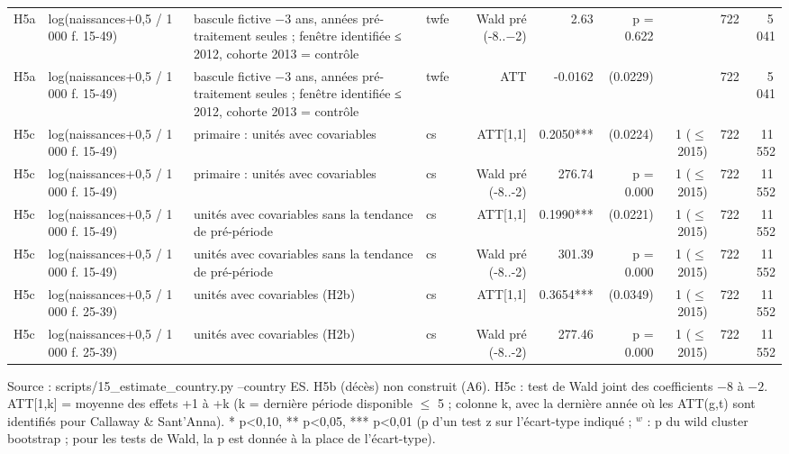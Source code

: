 \begin{table}
\begin{threeparttable}
\begin{tabular}{lp{4.3cm}p{7.1cm}lrrrrrr}
H5a & log(naissances+0,5 / 1 000 f. 15-49) & bascule fictive $-$3 ans, années pré-traitement seules ; fenêtre identifiée ≤ 2012, cohorte 2013 = contrôle & twfe & Wald pré (-8..$-$2) & 2.63 & p = 0.622 &  & 722 & 5\,041 \\
H5a & log(naissances+0,5 / 1 000 f. 15-49) & bascule fictive $-$3 ans, années pré-traitement seules ; fenêtre identifiée ≤ 2012, cohorte 2013 = contrôle & twfe & ATT & -0.0162 & (0.0229) &  & 722 & 5\,041 \\
H5c & log(naissances+0,5 / 1 000 f. 15-49) & primaire : unités avec covariables & cs & ATT[1,1] & 0.2050*** & (0.0224) & 1 ($\leq$ 2015) & 722 & 11\,552 \\
H5c & log(naissances+0,5 / 1 000 f. 15-49) & primaire : unités avec covariables & cs & Wald pré (-8..-2) & 276.74 & p = 0.000 & 1 ($\leq$ 2015) & 722 & 11\,552 \\
H5c & log(naissances+0,5 / 1 000 f. 15-49) & unités avec covariables sans la tendance de pré-période & cs & ATT[1,1] & 0.1990*** & (0.0221) & 1 ($\leq$ 2015) & 722 & 11\,552 \\
H5c & log(naissances+0,5 / 1 000 f. 15-49) & unités avec covariables sans la tendance de pré-période & cs & Wald pré (-8..-2) & 301.39 & p = 0.000 & 1 ($\leq$ 2015) & 722 & 11\,552 \\
H5c & log(naissances+0,5 / 1 000 f. 25-39) & unités avec covariables (H2b) & cs & ATT[1,1] & 0.3654*** & (0.0349) & 1 ($\leq$ 2015) & 722 & 11\,552 \\
H5c & log(naissances+0,5 / 1 000 f. 25-39) & unités avec covariables (H2b) & cs & Wald pré (-8..-2) & 277.46 & p = 0.000 & 1 ($\leq$ 2015) & 722 & 11\,552 \\
\bottomrule
\end{tabular}
\begin{tablenotes}\footnotesize
\item Source : scripts/15\_estimate\_country.py --country ES. H5b (décès) non construit (A6). H5c : test de Wald joint des coefficients $-8$ à $-2$. ATT[1,k] = moyenne des effets +1 à +k (k = dernière période disponible $\leq$ 5 ; colonne k, avec la dernière année où les ATT(g,t) sont identifiés pour Callaway \& Sant'Anna). * p<0,10, ** p<0,05, *** p<0,01 (p d'un test z sur l'écart-type indiqué ; $^{w}$ : p du wild cluster bootstrap ; pour les tests de Wald, la p est donnée à la place de l'écart-type).
\end{tablenotes}
\end{threeparttable}
\end{table}
